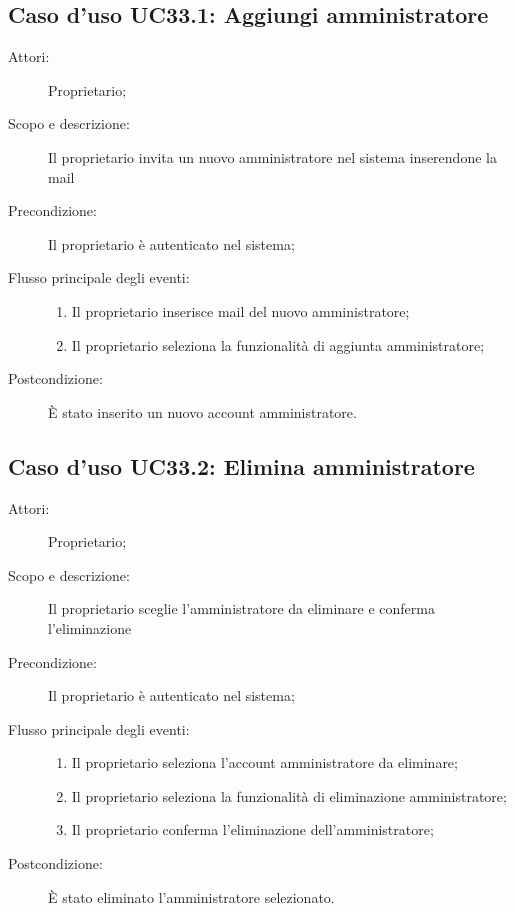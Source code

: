 \subsection{Caso d'uso UC33.1: Aggiungi amministratore}\begin{description}
\item[Attori:] Proprietario;
\item[Scopo e descrizione:] Il proprietario invita un nuovo amministratore nel sistema inserendone la mail
      \item[Precondizione:] Il proprietario è autenticato nel sistema;

        \item[Flusso principale degli eventi:] \begin{enumerate}
          \item Il proprietario inserisce mail del nuovo amministratore;
          \item Il proprietario seleziona la funzionalità di aggiunta amministratore;

      \end{enumerate}
    \item[Postcondizione:] È stato inserito un nuovo account amministratore.
  \end{description}
\hypertarget{UC33.2}{}
\subsection{Caso d'uso UC33.2: Elimina amministratore}\begin{description}
\item[Attori:] Proprietario;
\item[Scopo e descrizione:] Il proprietario sceglie l'amministratore da eliminare e conferma l'eliminazione
      \item[Precondizione:] Il proprietario è autenticato nel sistema;

        \item[Flusso principale degli eventi:] \begin{enumerate}
          \item Il proprietario seleziona l'account amministratore da eliminare;
          \item Il proprietario seleziona la funzionalità di eliminazione amministratore;
          \item Il proprietario conferma l'eliminazione dell'amministratore;

      \end{enumerate}
    \item[Postcondizione:] È stato eliminato l'amministratore selezionato.
  \end{description}
